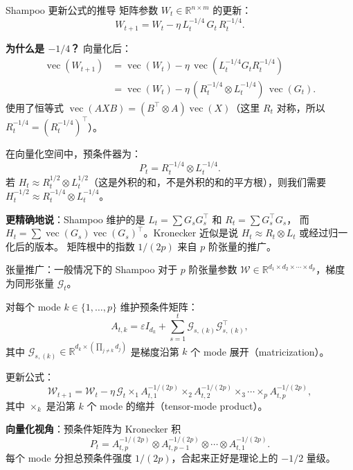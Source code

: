 \documentclass[aspectratio=169,10pt]{ctexbeamer}
\newcommand{\R}{\mathbb{R}}
\newcommand{\vect}{\operatorname{vec}}
\newcommand{\eps}{\varepsilon}
\begin{document}
\begin{frame}{Shampoo 更新公式的推导}
矩阵参数 $W_t\in\R^{n\times m}$ 的更新：
\[
  \boxed{W_{t+1}=W_t-\eta\,L_t^{-1/4}\,G_t\,R_t^{-1/4}.}
\]

\vspace{.25cm}
\textbf{为什么是 $-1/4$？} 向量化后：
\[
  \begin{aligned}
  \vect(W_{t+1}) &= \vect(W_t)-\eta\,\vect(L_t^{-1/4}G_t R_t^{-1/4})\\[3pt]
  &= \vect(W_t)-\eta\,(R_t^{-1/4}\otimes L_t^{-1/4})\,\vect(G_t).
  \end{aligned}
\]
使用了恒等式 $\vect(AXB)=(B^\top\otimes A)\vect(X)$（这里 $R_t$ 对称，所以 $R_t^{-1/4}=(R_t^{-1/4})^\top$）。

\vspace{.25cm}
在向量化空间中，预条件器为：
\[
  P_t=R_t^{-1/4}\otimes L_t^{-1/4}.
\]
若 $H_t\approx R_t^{1/2}\otimes L_t^{1/2}$（这是外积的和，不是外积的和的平方根），则我们需要
$H_t^{-1/2}\approx R_t^{-1/4}\otimes L_t^{-1/4}$。

\vspace{.25cm}
\textbf{更精确地说}：Shampoo 维护的是 $L_t=\sum G_s G_s^\top$ 和 $R_t=\sum G_s^\top G_s$，
而 $H_t=\sum\vect(G_s)\vect(G_s)^\top$。Kronecker 近似是说 $H_t\approx R_t\otimes L_t$ 或经过归一化后的版本。
矩阵根中的指数 $1/(2p)$ 来自 $p$ 阶张量的推广。
\end{frame}

\begin{frame}{张量推广：一般情况下的 Shampoo}
对于 $p$ 阶张量参数 $\mathcal{W}\in\R^{d_1\times d_2\times\cdots\times d_p}$，梯度为同形张量 $\mathcal{G}_t$。

\vspace{.25cm}
对每个 mode $k\in\{1,\ldots,p\}$ 维护预条件矩阵：
\[
  A_{t,k}=\eps I_{d_k}+\sum_{s=1}^t\mathcal{G}_{s,(k)}\mathcal{G}_{s,(k)}^\top,
\]
其中 $\mathcal{G}_{s,(k)}\in\R^{d_k\times(\prod_{j\neq k}d_j)}$ 是梯度沿第 $k$ 个 mode 展开（matricization）。

\vspace{.25cm}
更新公式：
\[
  \mathcal{W}_{t+1}=\mathcal{W}_t-\eta\,\mathcal{G}_t\times_1 A_{t,1}^{-1/(2p)}\times_2 A_{t,2}^{-1/(2p)}\times_3\cdots\times_p A_{t,p}^{-1/(2p)},
\]
其中 $\times_k$ 是沿第 $k$ 个 mode 的缩并（tensor-mode product）。

\vspace{.25cm}
\textbf{向量化视角}：预条件矩阵为 Kronecker 积
\[
  P_t=A_{t,p}^{-1/(2p)}\otimes A_{t,p-1}^{-1/(2p)}\otimes\cdots\otimes A_{t,1}^{-1/(2p)}.
\]
每个 mode 分担总预条件强度 $1/(2p)$，合起来正好是理论上的 $-1/2$ 量级。
\end{frame}
\end{document}
